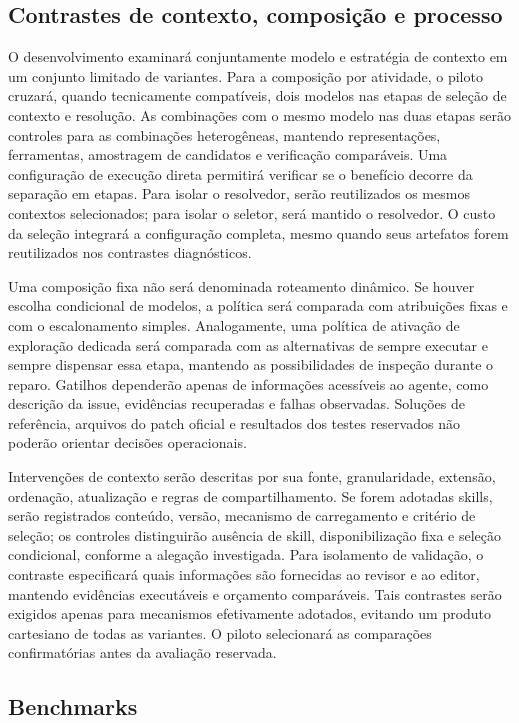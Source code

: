 \subsection{Contrastes de contexto, composição e processo}

O desenvolvimento examinará conjuntamente modelo e estratégia de contexto em um conjunto limitado de variantes. Para a composição por atividade, o piloto cruzará, quando tecnicamente compatíveis, dois modelos nas etapas de seleção de contexto e resolução. As combinações com o mesmo modelo nas duas etapas serão controles para as combinações heterogêneas, mantendo representações, ferramentas, amostragem de candidatos e verificação comparáveis. Uma configuração de execução direta permitirá verificar se o benefício decorre da separação em etapas. Para isolar o resolvedor, serão reutilizados os mesmos contextos selecionados; para isolar o seletor, será mantido o resolvedor. O custo da seleção integrará a configuração completa, mesmo quando seus artefatos forem reutilizados nos contrastes diagnósticos.

Uma composição fixa não será denominada roteamento dinâmico. Se houver escolha condicional de modelos, a política será comparada com atribuições fixas e com o escalonamento simples. Analogamente, uma política de ativação de exploração dedicada será comparada com as alternativas de sempre executar e sempre dispensar essa etapa, mantendo as possibilidades de inspeção durante o reparo. Gatilhos dependerão apenas de informações acessíveis ao agente, como descrição da issue, evidências recuperadas e falhas observadas. Soluções de referência, arquivos do patch oficial e resultados dos testes reservados não poderão orientar decisões operacionais.

Intervenções de contexto serão descritas por sua fonte, granularidade, extensão, ordenação, atualização e regras de compartilhamento. Se forem adotadas skills, serão registrados conteúdo, versão, mecanismo de carregamento e critério de seleção; os controles distinguirão ausência de skill, disponibilização fixa e seleção condicional, conforme a alegação investigada. Para isolamento de validação, o contraste especificará quais informações são fornecidas ao revisor e ao editor, mantendo evidências executáveis e orçamento comparáveis. Tais contrastes serão exigidos apenas para mecanismos efetivamente adotados, evitando um produto cartesiano de todas as variantes. O piloto selecionará as comparações confirmatórias antes da avaliação reservada.

\subsection{Benchmarks}

